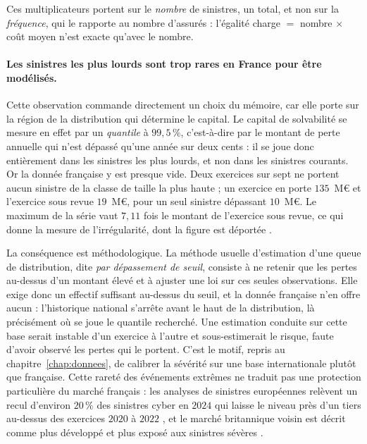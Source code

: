 \noindent Ces multiplicateurs portent sur le \emph{nombre} de sinistres, un total, et non sur la
\emph{fréquence}, qui le rapporte au nombre d'assurés : l'égalité charge $=$ nombre $\times$ coût
moyen n'est exacte qu'avec le nombre.

\paragraph{Les sinistres les plus lourds sont trop rares en France pour être modélisés.} Cette
observation commande directement un choix du mémoire, car elle porte sur la région de la
distribution qui détermine le capital. Le capital de solvabilité se mesure en effet par un
\emph{quantile} à $99{,}5\,\%$, c'est-à-dire par le montant de perte annuelle qui n'est dépassé
qu'une année sur deux cents : il se joue donc entièrement dans les sinistres les plus lourds, et
non dans les sinistres courants. Or la donnée française y est presque vide. Deux exercices sur
sept ne portent aucun sinistre de la classe de taille la plus haute ; un exercice en porte
$135$~M\euro{} et l'exercice sous revue $19$~M\euro, pour un seul sinistre dépassant $10$~M\euro. Le
maximum de la série vaut $7{,}11$ fois le montant de l'exercice sous revue, ce qui donne la
mesure de l'irrégularité, dont la figure est déportée \matcomp.

\medskip
\noindent La conséquence est méthodologique. La méthode usuelle d'estimation d'une queue de
distribution, dite \emph{par dépassement de seuil}, consiste à ne retenir que les pertes
au-dessus d'un montant élevé et à ajuster une loi sur ces seules observations. Elle exige donc un
effectif suffisant au-dessus du seuil, et la donnée française n'en offre aucun : l'historique
national s'arrête avant le haut de la distribution, là précisément où se joue le quantile
recherché. Une estimation conduite sur cette base serait instable d'un exercice à l'autre et
sous-estimerait le risque, faute d'avoir observé les pertes qui le portent. C'est le motif,
repris au chapitre~\ref{chap:donnees}, de calibrer la sévérité sur une base internationale plutôt
que française. Cette rareté des événements extrêmes ne traduit pas une protection particulière du
marché français : les analyses de sinistres européennes relèvent un recul d'environ $20\,\%$ des
sinistres cyber en $2024$ qui laisse le niveau près d'un tiers au-dessus des exercices $2020$ à
$2022$ \citep{marsh2025}, et le marché britannique voisin est décrit comme plus développé et plus
exposé aux sinistres sévères \citep{dsit2025}.

